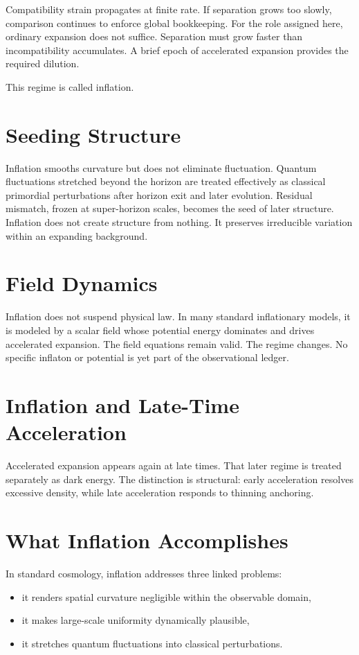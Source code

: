 \documentclass[11pt,twoside,openright]{book}
\begin{document}
Compatibility strain propagates at finite rate. If separation grows too slowly, comparison continues to enforce global bookkeeping. For the role assigned here, ordinary expansion does not suffice. Separation must grow faster than incompatibility accumulates. A brief epoch of accelerated expansion provides the required dilution.

This regime is called inflation.

\section*{Seeding Structure}

Inflation smooths curvature but does not eliminate fluctuation. Quantum fluctuations stretched beyond the horizon are treated effectively as classical primordial perturbations after horizon exit and later evolution. Residual mismatch, frozen at super-horizon scales, becomes the seed of later structure. Inflation does not create structure from nothing. It preserves irreducible variation within an expanding background.

\section*{Field Dynamics}

Inflation does not suspend physical law. In many standard inflationary models, it is modeled by a scalar field whose potential energy dominates and drives accelerated expansion. The field equations remain valid. The regime changes. No specific inflaton or potential is yet part of the observational ledger.

\section*{Inflation and Late-Time Acceleration}

Accelerated expansion appears again at late times. That later regime is treated separately as dark energy. The distinction is structural: early acceleration resolves excessive density, while late acceleration responds to thinning anchoring.

\section*{What Inflation Accomplishes}

In standard cosmology, inflation addresses three linked problems:

\begin{itemize}
\item it renders spatial curvature negligible
      within the observable domain,
\item it makes large-scale uniformity dynamically plausible,
\item it stretches quantum fluctuations
      into classical perturbations.
\end{itemize}
\end{document}
